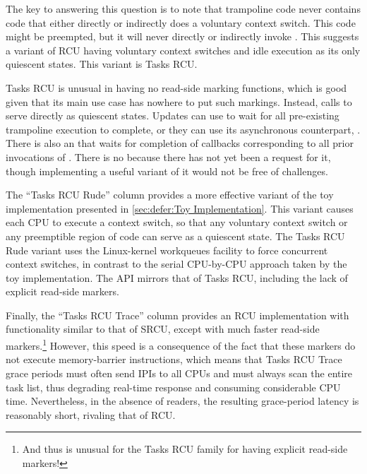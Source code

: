 The key to answering this question is to note that trampoline code
never contains code that either directly or indirectly does a
voluntary context switch.
This code might be preempted, but it will never directly or indirectly
invoke .
This suggests a variant of RCU having voluntary context switches and
idle execution as its only quiescent states.
This variant is Tasks RCU\@.

Tasks RCU is unusual in having no read-side marking functions, which
is good given that its main use case has nowhere to put such markings.
Instead, calls to  serve directly as quiescent states.
Updates can use  to wait for all pre-existing
trampoline execution to complete, or they can use its asynchronous
counterpart, .
There is also an  that waits for completion
of callbacks corresponding to all prior invocations of .
There is no  because there has
not yet been a request for it, though implementing a useful variant of
it would not be free of challenges.

\QuickQuizEnd

The ``Tasks RCU Rude'' column provides a more effective variant
of the toy implementation presented in
\cref{sec:defer:Toy Implementation}.
This variant causes each CPU to execute a context switch,
so that any voluntary context switch or any preemptible region of
code can serve as a quiescent state.
The Tasks RCU Rude variant uses the Linux-kernel workqueues facility to
force concurrent context switches, in contrast to the serial
CPU-by-CPU approach taken by the toy implementation.
The API mirrors that of Tasks RCU, including the lack of explicit
read-side markers.

Finally, the ``Tasks RCU Trace'' column provides an RCU implementation
with functionality similar to that of SRCU, except with much faster
read-side markers.\footnote{
	And thus is unusual for the Tasks RCU family for having
	explicit read-side markers!}
However, this speed is a consequence of the fact that these markers
do not execute memory-barrier instructions, which means that Tasks RCU
Trace grace periods must often send IPIs to all CPUs and must always
scan the entire task list, thus degrading real-time response and
consuming considerable CPU time.
Nevertheless, in the absence of readers, the resulting grace-period
latency is reasonably short, rivaling that of RCU\@.

